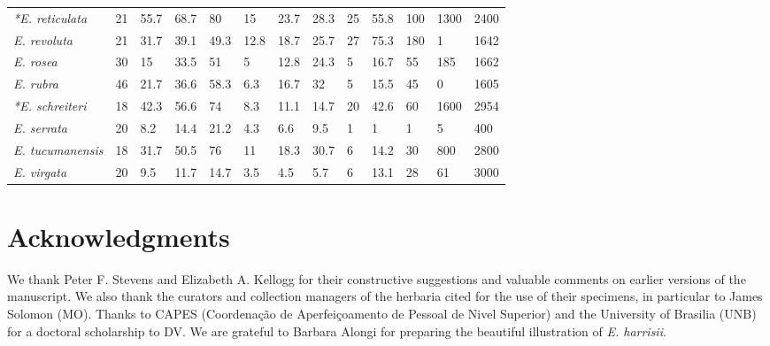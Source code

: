 \documentclass[fleqn,10pt,lineno]{wlpeerj} %
\begin{document}
\begin{table}[hbt]
\begin{center}
\begin{tabular}{lllllllllllll}
\emph{*E. reticulata} & 21 & 55.7 & 68.7 & 80 & 15 & 23.7 & 28.3 & 25 & 55.8 & 100 & 1300 & 2400\\
\emph{E. revoluta} & 21 & 31.7 & 39.1 & 49.3 & 12.8 & 18.7 & 25.7 & 27 & 75.3 & 180 & 1 & 1642\\
\emph{E. rosea} & 30 & 15 & 33.5 & 51 & 5 & 12.8 & 24.3 & 5 & 16.7 & 55 & 185 & 1662\\
\emph{E. rubra} & 46 & 21.7 & 36.6 & 58.3 & 6.3 & 16.7 & 32 & 5 & 15.5 & 45 & 0 & 1605\\
\emph{*E. schreiteri} & 18 & 42.3 & 56.6 & 74 & 8.3 & 11.1 & 14.7 & 20 & 42.6 & 60 & 1600 & 2954\\
\emph{E. serrata} & 20 & 8.2 & 14.4 & 21.2 & 4.3 & 6.6 & 9.5 & 1 & 1 & 1 & 5 & 400\\
\emph{E. tucumanensis} & 18 & 31.7 & 50.5 & 76 & 11 & 18.3 & 30.7 & 6 & 14.2 & 30 & 800 & 2800\\
\emph{E. virgata} & 20 & 9.5 & 11.7 & 14.7 & 3.5 & 4.5 & 5.7 & 6 & 13.1 & 28 & 61 & 3000\\
\bottomrule
\end{tabular}
\end{center}
\end{table}


\section*{Acknowledgments}
We thank Peter F. Stevens and Elizabeth A. Kellogg for their constructive suggestions and valuable comments on earlier versions of the manuscript. We also thank the curators and collection managers of the herbaria cited for the use of their specimens, in particular to James Solomon (MO). Thanks to CAPES (Coordenação de Aperfeiçoamento de Pessoal de Nivel Superior) and the University of Brasilia (UNB) for a doctoral scholarship to DV. We are grateful to Barbara Alongi for preparing the beautiful illustration of \emph{E. harrisii}.


\end{document}
